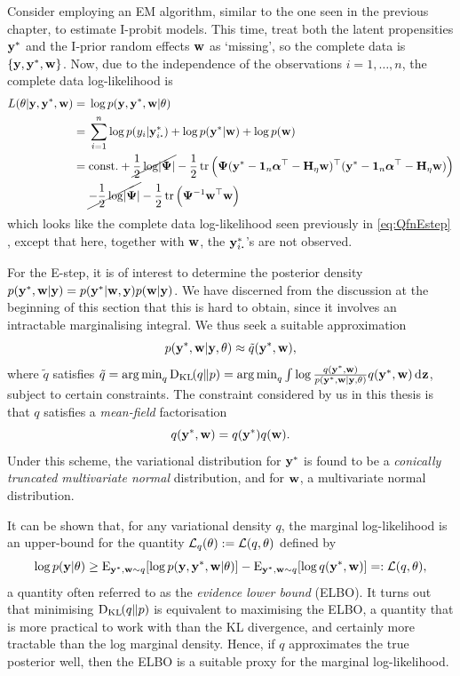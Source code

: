 Consider employing an EM algorithm, similar to the one seen in the previous chapter, to estimate I-probit models.
This time, treat both the latent propensities ${\mathbf y}^*$ and the I-prior random effects ${\mathbf w}$ as `missing', so the complete data is $\{{\mathbf y},{\mathbf y}^*,{\mathbf w}\}$.
Now, due to the independence of the observations $i=1,\dots,n$, the complete data log-likelihood is
\begin{align}
  L(\theta |\by,\by^*,\bw) 
  ={}& \log p(\by,\by^*,\bw|\theta) \nonumber \\
  ={}& \sum_{i=1}^n \log p(y_i|\by^*_{i \bigcdot}) 
  + \log p(\by^*|\bw) + \log p(\bw) \nonumber \\
  ={}& \const + \cancel{\half\log\abs{\bPsi}} - \half \tr  
  \Big(
    \bPsi(\by^* - \bone_n\balpha^\top - \bH_\eta\bw)^\top 
    (\by^* - \bone_n\balpha^\top - \bH_\eta\bw)
  \Big) \nonumber \\
  &\cancel{- \half\log\abs{\bPsi}} 
  - \half \tr \Big(\bPsi^{-1} \bw^\top  \bw \Big)
  \label{eq:logjointprobit}
\end{align}
which looks like the complete data log-likelihood seen previously in \cref{eq:QfnEstep} , except that here, together with ${\mathbf w}$, the $\by^*_{i \bigcdot}$'s are not observed.

For the E-step, it is of interest to determine the posterior density $p({\mathbf y}^*,{\mathbf w}|{\mathbf y}) = p({\mathbf y}^*|{\mathbf w},{\mathbf y})p({\mathbf w}|{\mathbf y})$. 
We have discerned from the discussion at the beginning of this section that this is hard to obtain, since it involves an intractable marginalising integral.
We thus seek a suitable approximation
\[
  p({\mathbf y}^*,{\mathbf w} | {\mathbf y}, \theta) \approx \tilde q({\mathbf y}^*,{\mathbf w}),
\]
where $\tilde q$ satisfies $\tilde q = \operatorname*{arg\,min}_q \operatorname{D_{KL}\hspace{-1pt}}(q\Vert p) = \operatorname*{arg\,min}_q \int \log \frac{q({\mathbf y}^*,{\mathbf w})}{p({\mathbf y}^*,{\mathbf w} | {\mathbf y}, \theta)} q({\mathbf y}^*,{\mathbf w}) \operatorname{d}\hspace{0.5pt}\!{\mathbf z}$, subject to certain constraints.
The constraint considered by us in this thesis is that $q$ satisfies a \emph{mean-field} factorisation
\[
  q({\mathbf y}^*,{\mathbf w}) = q({\mathbf y}^*)q({\mathbf w}).
\]
Under this scheme, the variational distribution for ${\mathbf y}^*$ is found to be a \emph{conically truncated multivariate normal} distribution, and for ${\mathbf w}$, a multivariate normal distribution.

It can be shown that, for any variational density $q$, the marginal log-likelihood is an upper-bound for the quantity ${\mathcal L}_q(\theta) := {\mathcal L}(q,\theta)$ defined by
\[
  \log p({\mathbf y}|\theta) \geq 
    \operatorname{E}_{{\mathbf y}^*,{\mathbf w}\sim q} [\log p({\mathbf y},{\mathbf y}^*,{\mathbf w}|\theta)]
    - \operatorname{E}_{{\mathbf y}^*,{\mathbf w}\sim q} [ \log  q({\mathbf y}^*,{\mathbf w}) ] =: {\mathcal L}(q,\theta),
\]
a quantity often referred to as the \emph{evidence lower bound} (ELBO).
It turns out that minimising $\operatorname{D_{KL}\hspace{-1pt}}(q\Vert p)$ is equivalent to maximising the ELBO, a quantity that is more practical to work with than the KL divergence, and certainly more tractable than the log marginal density.
Hence, if $q$ approximates the true posterior well, then the ELBO is a suitable proxy for the marginal log-likelihood.

